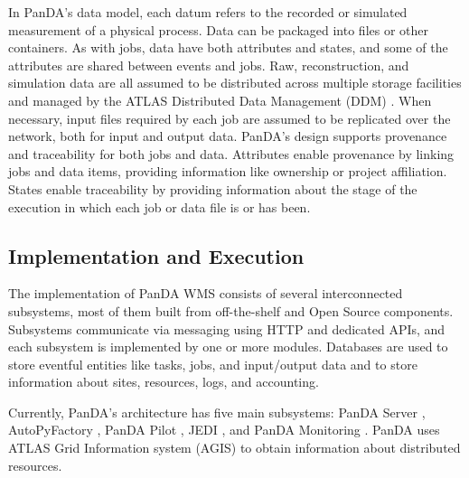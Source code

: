 In PanDA's data model, each datum refers to the recorded or simulated
measurement of a physical process. Data can be packaged into files or other
containers. As with jobs, data have both attributes and states, and some of
the attributes are shared between events and jobs. Raw, reconstruction, and
simulation data are all assumed to be distributed across multiple storage
facilities and managed by the ATLAS Distributed Data Management (DDM)
\cite{garonne2012atlas}. When necessary, input files required by each job are
assumed to be replicated over the network, both for input and output data.
PanDA's design supports provenance and traceability for both jobs and data.
Attributes enable provenance by linking jobs and data items, providing
information like ownership or project affiliation. States enable traceability
by providing information about the stage of the execution in which each job
or data file is or has been.

\subsection{Implementation and Execution}
\label{subsec:implementation}

The implementation of PanDA WMS consists of several interconnected
subsystems, most of them built from off-the-shelf and Open Source components.
Subsystems communicate via messaging using HTTP and dedicated APIs, and each
subsystem is implemented by one or more modules. Databases are used to store
eventful entities like tasks, jobs, and input/output data and to store
information about sites, resources, logs, and accounting.

Currently, PanDA's architecture has five main subsystems:
PanDA Server \cite{maeno2011overview},
AutoPyFactory \cite{caballero2012autopyfactory]},
PanDA Pilot \cite{nilsson2011atlas},
JEDI \cite{borodin2015scaling},
and PanDA Monitoring \cite{klimentov2011atlas}. PanDA uses ATLAS Grid
Information system (AGIS) \cite{1742-6596-513-3-032001} to obtain information
about distributed resources.

